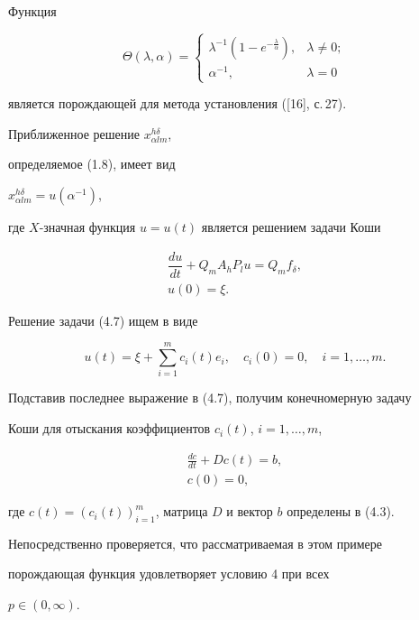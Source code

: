 \begin{exam}


Функция


$$


\Theta(\lambda, \alpha)=


\begin{cases}


\lambda^{-1}


(1-e^{-\frac{\lambda}{\alpha}} ), & \lambda \neq 0; \\


{\alpha}^{-1}, & \lambda =0 


\end{cases}


$$


является порождающей для метода установления ([16], с.\,27).


Приближенное решение $x_{\alpha l m}^{h \delta}$,


определяемое (1.8), имеет вид


$x_{\alpha l m}^{h \delta}=u({\alpha}^{-1})$,


где $X$-значная функция $u=u(t)$ является решением задачи Коши


\begin{equation}


\begin{array}{c}


\dfrac{du}{dt} + Q_m A_h P_l u= Q_m f_{\delta}, \\ [3mm]


u(0)=\xi.


\end{array}


\tag{4.7}


\end{equation}


Решение задачи (4.7) ищем в виде


$$


u(t)=\xi + \sum_{i=1}^m c_i(t) e_i,


\quad c_i(0)=0, \quad i=1,\dotsc,m.


$$


Подставив последнее выражение в (4.7), получим конечномерную задачу


Коши для отыскания коэффициентов $c_i(t)$, $i=1,\dotsc,m$,


\begin{gather*}


\frac{dc}{dt} + Dc(t)=b , \\ 


c(0)=0,


\end{gather*}


где $c(t)= (c_i(t))_{i=1}^m$, матрица $D$ и вектор $b$ определены в (4.3).


Непосредственно проверяется, что рассматриваемая в этом примере


порождающая функция удовлетворяет условию 4 при всех


$ p \in (0, \infty)$.


\end{exam}





